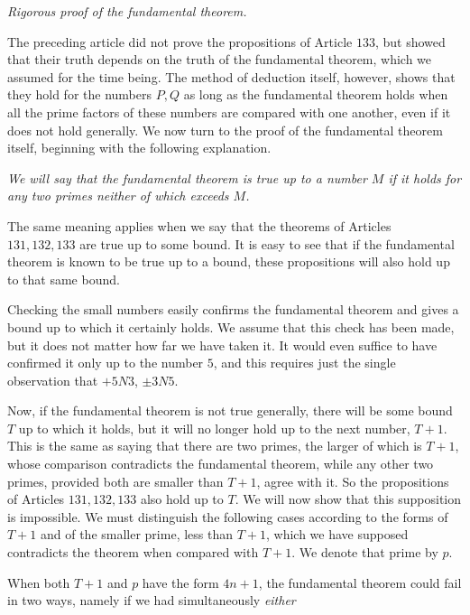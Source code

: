\begin{center}\emph{Rigorous proof of the fundamental theorem.}\end{center}

The preceding article did not prove the propositions of Article $133$, but showed that their truth depends on the truth of the fundamental theorem, which we assumed for the time being. The method of deduction itself, however, shows that they hold for the numbers $P,Q$ as long as the fundamental theorem holds when all the prime factors of these numbers are compared with one another, even if it does not hold generally. We now turn to the proof of the fundamental theorem itself, beginning with the following explanation.

\emph{We will say that the fundamental theorem is true up to a number $M$ if it holds for any two primes neither of which exceeds $M$.}

The same meaning applies when we say that the theorems of Articles $131,132,133$ are true up to some bound. It is easy to see that if the fundamental theorem is known to be true up to a bound, these propositions will also hold up to that same bound.

Checking the small numbers easily confirms the fundamental theorem and gives a bound up to which it certainly holds. We assume that this check has been made, but it does not matter how far we have taken it. It would even suffice to have confirmed it only up to the number $5$, and this requires just the single observation that $+5N3$, $\pm3N5$.

Now, if the fundamental theorem is not true generally, there will be some bound $T$ up to which it holds, but it will no longer hold up to the next number, $T+1$. This is the same as saying that there are two primes, the larger of which is $T+1$, whose comparison contradicts the fundamental theorem, while any other two primes, provided both are smaller than $T+1$, agree with it. So the propositions of Articles $131,132,133$ also hold up to $T$. We will now show that this supposition is impossible. We must distinguish the following cases according to the forms of $T+1$ and of the smaller prime, less than $T+1$, which we have supposed contradicts the theorem when compared with $T+1$. We denote that prime by $p$.

When both $T+1$ and $p$ have the form $4n+1$, the fundamental theorem could fail in two ways, namely if we had simultaneously \emph{either}

